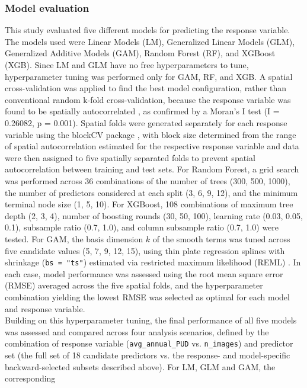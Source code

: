 \documentclass[hidelinks, 11pt]{article}
\begin{document}
\subsubsection{Model evaluation}
This study evaluated five different models for predicting the response
variable. The models used were Linear Models (LM), Generalized Linear
Models (GLM), Generalized Additive Models (GAM), Random Forest (RF), and
XGBoost (XGB). Since LM and GLM have no free hyperparameters to tune,
hyperparameter tuning was performed only for GAM, RF, and XGB. A spatial
cross-validation was applied to find the best model configuration, rather
than conventional random k-fold cross-validation, because the response
variable was found to be spatially autocorrelated
\citep{roberts2017crossvalidation}, as confirmed by a Moran's I test
(I = 0.26082, p = 0.001). Spatial folds were generated separately for each
response variable using the blockCV package \citep{valavi2019blockcv},
with block size determined from the range of spatial autocorrelation
estimated for the respective response variable and data were then
assigned to five spatially separated folds to prevent spatial
autocorrelation between training and test sets. For Random Forest, a grid
search was performed across 36 combinations of the number of trees (300,
500, 1000), the number of predictors considered at each split (3, 6, 9,
12), and the minimum terminal node size (1, 5, 10). For XGBoost, 108
combinations of maximum tree depth (2, 3, 4), number of boosting rounds
(30, 50, 100), learning rate (0.03, 0.05, 0.1), subsample ratio (0.7,
1.0), and column subsample ratio (0.7, 1.0) were tested. For GAM, the
basis dimension $k$ of the smooth terms was tuned across five candidate
values (5, 7, 9, 12, 15), using thin plate regression splines with
shrinkage (\texttt{bs = "ts"}) estimated via restricted maximum likelihood
(REML) \citep{wood2025gam}. In each case, model performance was assessed
using the root mean square error (RMSE) averaged across the five spatial
folds, and the hyperparameter combination yielding the lowest RMSE was
selected as optimal for each model and response variable.
\\
Building on this hyperparameter tuning, the final performance of all five
models was assessed and compared across four analysis scenarios, defined
by the combination of response variable (\texttt{avg\_annual\_PUD} vs.
\texttt{n\_images}) and predictor set (the full set of 18 candidate
predictors vs. the response- and model-specific backward-selected
subsets described above). For LM, GLM and GAM, the corresponding
\end{document}
